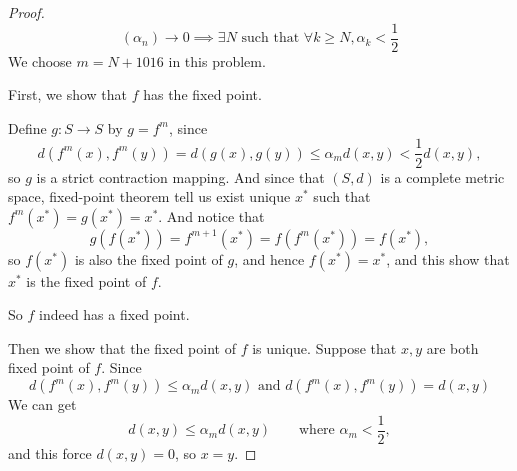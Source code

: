 \begin{proof}
    \[
        (\alpha_n) \to 0 \implies \exists N \text{ such that } \forall k \ge N, \alpha_k < \frac{1}{2}
    \]
    We choose $m = N + 1016$ in this problem.
    
    First, we show that $f$ has the fixed point.

    Define $g : S \to S$ by $g = f^m$, since
    \[
        d(f^m(x), f^m(y)) = d(g(x), g(y)) \le \alpha_m d(x,y) < \frac{1}{2}d(x,y),
    \]
    so $g$ is a strict contraction mapping. And since that $(S, d)$ is a complete metric space, fixed-point theorem tell us exist unique $x^*$ such that $f^m(x^*) = g(x^*) = x^*$. And notice that
    \[
        g(f(x^*)) = f^{m+1}(x^*) = f(f^m(x^*)) = f(x^*),
    \]
    so $f(x^*)$ is also the fixed point of $g$, and hence $f(x^*) = x^*$, and this show that $x^*$ is the fixed point of $f$.


    So $f$ indeed has a fixed point.

    Then we show that the fixed point of $f$ is unique. Suppose that $x, y$ are both fixed point of $f$. Since
    \[
        d(f^m(x), f^m(y)) \le \alpha_m d(x,y) \text{ and } d(f^m(x), f^m(y)) = d(x,y)
    \]
    We can get
    \[
        d(x,y) \le \alpha_md(x,y) \qquad \text{where } \alpha_m < \frac{1}{2},
    \]
    and this force $d(x, y) = 0$, so $x = y$.
\end{proof}

